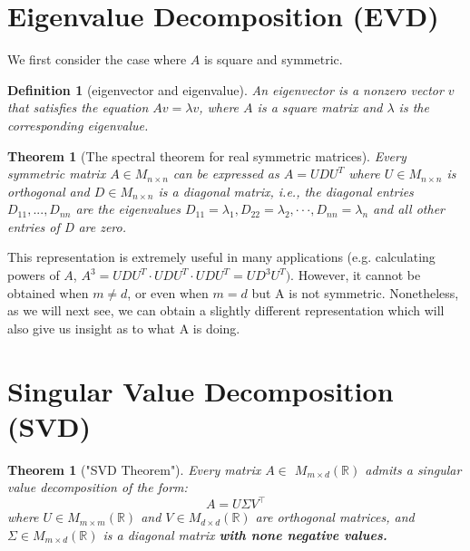 \documentclass[11pt, oneside]{article}   	%
\newtheorem{theorem}[lemma]{Theorem}
\newtheorem{definition}[lemma]{Definition}
\begin{document}
\pagebreak
\section{Eigenvalue Decomposition (EVD)}

We first consider the case where $A$ is square and symmetric.
\begin{definition}[eigenvector and eigenvalue]
An eigenvector is a nonzero vector $v$ that satisfies the equation $Av=\lambda v$, where $A$ is a square matrix and $\lambda$ is the corresponding eigenvalue.
\end{definition}

\begin{theorem}[The spectral theorem for real symmetric matrices]
Every symmetric matrix $A\in M_{n\times n}$ can be expressed as $A=UDU^{T}$ where $U\in M_{n\times n}$ is orthogonal and $D\in M_{n\times n}$ is a diagonal matrix, i.e., the diagonal entries $D_{11},...,D_{nn}$ are the eigenvalues $D_{11}=\lambda_{1},D_{22}=\lambda_{2},\cdot\cdot\cdot,D_{nn}=\lambda_{n}$ and all other entries of D are zero.
\end{theorem}

This representation is extremely useful in many applications (e.g. calculating powers of $A$, $A^{3}=UDU^{T}\cdot UDU^{T}\cdot UDU^{T}=UD^{3}U^{T})$. However, it cannot be obtained when $m\neq d$, or even when $m=d$ but A is not symmetric. Nonetheless, as we will next see, we can obtain a slightly different representation which will also give us insight as to what A is doing.

\section{Singular Value Decomposition (SVD)}


\begin{theorem}["SVD Theorem"]
Every matrix $A\in$ $M_{m\times d}(\mathbb{R})$ admits a singular value decomposition of the form:
$$A=U\Sigma V^{\top}$$
where $U\in M_{m\times m}(\mathbb{R})$ and $V\in M_{d\times d}(\mathbb{R})$ are orthogonal matrices, and $\Sigma\in M_{m\times d}(\mathbb{R})$ is a diagonal matrix \bf{with none negative values}. 
\end{theorem}
\end{document}
